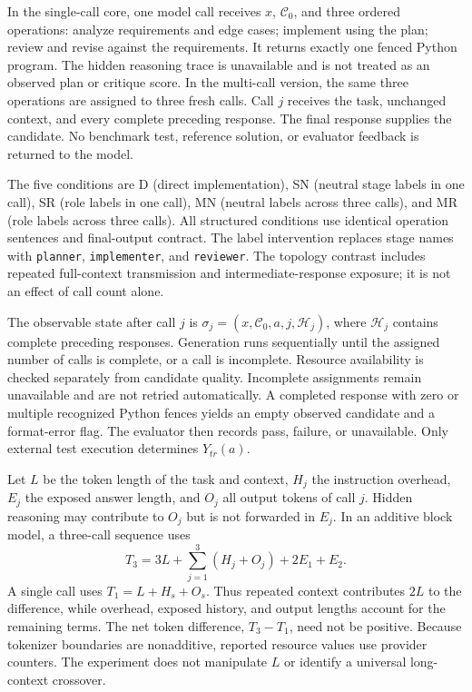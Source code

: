 In the single-call core, one model call receives $x$, $\mathcal{C}_0$, and three ordered operations: analyze requirements and edge cases; implement using the plan; review and revise against the requirements. It returns exactly one fenced Python program. The hidden reasoning trace is unavailable and is not treated as an observed plan or critique score. In the multi-call version, the same three operations are assigned to three fresh calls. Call $j$ receives the task, unchanged context, and every complete preceding response. The final response supplies the candidate. No benchmark test, reference solution, or evaluator feedback is returned to the model.

The five conditions are D (direct implementation), SN (neutral stage labels in one call), SR (role labels in one call), MN (neutral labels across three calls), and MR (role labels across three calls). All structured conditions use identical operation sentences and final-output contract. The label intervention replaces stage names with \texttt{planner}, \texttt{implementer}, and \texttt{reviewer}. The topology contrast includes repeated full-context transmission and intermediate-response exposure; it is not an effect of call count alone.

The observable state after call $j$ is $\sigma_j=(x,\mathcal{C}_0,a,j,\mathcal{H}_j)$, where $\mathcal{H}_j$ contains complete preceding responses. Generation runs sequentially until the assigned number of calls is complete, or a call is incomplete. Resource availability is checked separately from candidate quality. Incomplete assignments remain unavailable and are not retried automatically. A completed response with zero or multiple recognized Python fences yields an empty observed candidate and a format-error flag. The evaluator then records pass, failure, or unavailable. Only external test execution determines $Y_{tr}(a)$.

Let $L$ be the token length of the task and context, $H_j$ the instruction overhead, $E_j$ the exposed answer length, and $O_j$ all output tokens of call $j$. Hidden reasoning may contribute to $O_j$ but is not forwarded in $E_j$. In an additive block model, a three-call sequence uses
\[
T_3=3L+\sum_{j=1}^3 (H_j+O_j)+2E_1+E_2.
\]
A single call uses $T_1=L+H_s+O_s$. Thus repeated context contributes $2L$ to the difference, while overhead, exposed history, and output lengths account for the remaining terms. The net token difference, $T_3-T_1$, need not be positive. Because tokenizer boundaries are nonadditive, reported resource values use provider counters. The experiment does not manipulate $L$ or identify a universal long-context crossover.


